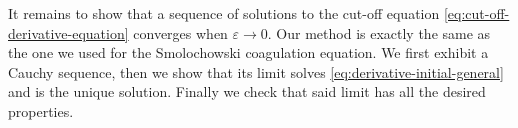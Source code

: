 \documentclass[11pt,a4paper]{article}
\newcommand{\RR}{\mathbb{R}}
\newcommand{\RRP}{\mathbb{R}^+_*}
\newcommand{\MC}{\mathcal{M}}
\newcommand{\brac}[1]{\left\langle#1\right\rangle}
\newtheorem{remark}[theorem]{Remark}
\begin{document}

It remains to show that a sequence of solutions to the cut-off equation \eqref{eq:cut-off-derivative-equation} converges when $\varepsilon \to 0$. Our method is exactly the same as the one we used for the Smolochowski coagulation equation. We first exhibit a Cauchy sequence, then we show that its limit solves \eqref{eq:derivative-initial-general} and is the unique solution. Finally we check that said limit has all the desired properties. 
\end{document}
